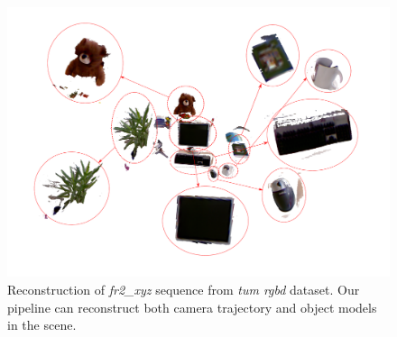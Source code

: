 

\begin{figure}[t!]
    \centering
    \includegraphics[width=\linewidth]{figs/teaser.pdf}\vspace{-1cm}
    \caption{Reconstruction of \textit{fr2\_xyz} sequence from \emph{tum rgbd} dataset. Our pipeline can reconstruct both camera trajectory and object models in the scene.}
    \label{fig:objectsandscene}
\end{figure}

